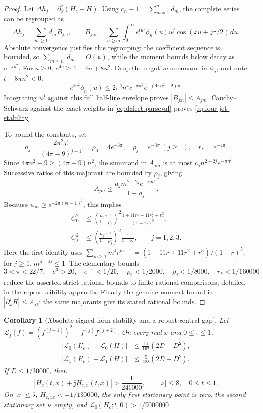 \documentclass[11pt]{article}
\numberwithin{equation}{section}
\newtheorem{corollary}[theorem]{Corollary}
\theoremstyle{definition}
\theoremstyle{remark}
\begin{document}
\begin{proof}
Let \(\Delta h_j=\partial_x^j(H_c-H)\).
Using \(c_n-1=\sum_{m=1}^n d_m\), the complete series can be regrouped as
\[
 \Delta h_j=\sum_{m\geq1}d_m B_{jm},\qquad
 B_{jm}=\sum_{n\geq m}\int_0^\infty
 e^{tu^2}\phi_n(u)u^j\cos(xu+j\pi/2)\,du.
\]
Absolute convergence justifies this regrouping: the coefficient
sequence is bounded, so \(\sum_{m\leq n}|d_m|=O(n)\), while the
moment bounds below decay as \(e^{-\pi n^2}\).
For \(u\geq0\), \(e^{4u}\geq1+4u+8u^2\).
Drop the negative summand in \(\phi_n\), and note \(t-8\pi n^2<0\):
\[
 e^{tu^2}\phi_n(u)
 \leq2\pi^2n^4e^{-\pi n^2}
 e^{-(4\pi n^2-9)u}.
\]
Integrating \(u^j\) against this full half-line envelope proves
\(|B_{jm}|\leq A_{jm}\).  Cauchy--Schwarz against the exact
weights in \eqref{eq:defect-parseval} proves
\eqref{eq:four-jet-stability}.

To bound the constants, set
\[
 a_j=\frac{2\pi^2j!}{(4\pi-9)^{j+1}},\quad
 \rho_0=4e^{-3\pi},\quad
 \rho_j=e^{-3\pi}\ (j\geq1),\quad r_*=e^{-4\pi}.
\]
Since \(4\pi n^2-9\geq(4\pi-9)n^2\), the summand in \(A_{jm}\)
is at most \(a_jn^{2-2j}e^{-\pi n^2}\).
Successive ratios of this majorant are bounded by \(\rho_j\), giving
\[
 A_{jm}\leq\frac{a_jm^{2-2j}e^{-\pi m^2}}{1-\rho_j}.
\]
Because \(w_m\geq e^{-2\pi(m-1)^2}\), this implies
\begin{align*}
 C_0^2&\leq
 \left(\frac{a_0e^{-\pi}}{1-\rho_0}\right)^2
 \frac{1+11r_*+11r_*^2+r_*^3}{(1-r_*)^5},\\
 C_j^2&\leq
 \left(\frac{a_je^{-\pi}}{1-\rho_j}\right)^2
 \frac1{1-r_*},\qquad j=1,2,3.
\end{align*}
Here the first identity uses
\(\sum_{m\geq1}m^4r^{m-1}=(1+11r+11r^2+r^3)/(1-r)^5\);
for \(j\geq1\), \(m^{4-4j}\leq1\).
The elementary bounds
\[
 3<\pi<22/7,\quad e^3>20,\quad
 e^{-\pi}<1/20,\quad
 \rho_0<1/2000,\quad \rho_j<1/8000,\quad r_*<1/160000
\]
reduce the asserted strict rational bounds to finite rational
comparisons, detailed in the reproducibility appendix.
Finally the genuine moment bound is \(|\partial_x^jH|\leq A_{j1}\);
the same majorants give its stated rational bounds.
\end{proof}

\begin{corollary}[Absolute signed-form stability and a robust central gap]
\label{cor:robust-gluing}
Let \(\mathscr L_j(f)=(f^{(j+1)})^2-f^{(j)}f^{(j+2)}\).
On every real \(x\) and \(0\leq t\leq1\),
\begin{align}
 |\mathscr L_0(H_c)-\mathscr L_0(H)|
 &\leq\frac{11}{192}(2D+D^2), \label{eq:L0-defect-transfer}\\
 |\mathscr L_1(H_c)-\mathscr L_1(H)|
 &\leq\frac5{288}(2D+D^2). \label{eq:L1-defect-transfer}
\end{align}
If \(D\leq1/30000\), then
\begin{equation}
 |H_c(t,x)+\mathbf jH_{c,x}(t,x)|>
 \frac1{240000},\qquad |x|\leq8,\quad 0\leq t\leq1.
 \label{eq:robust-central-gap}
\end{equation}
On \(|x|\leq5\), \(H_{c,xx}<-1/180000\); the only first stationary
point is zero, the second stationary set is empty, and
\(\mathscr L_0(H_c;t,0)>1/9000000\).
\end{corollary}
\end{document}
